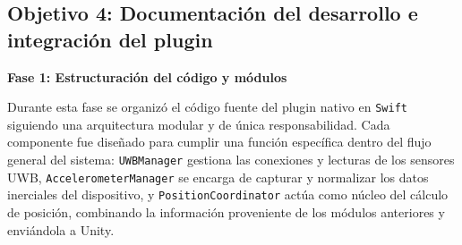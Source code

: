 




    \subsection{Objetivo 4: Documentación del desarrollo e integración del plugin}

\textbf{Fase 1: Estructuración del código y módulos}

Durante esta fase se organizó el código fuente del plugin nativo en \texttt{Swift} siguiendo una arquitectura modular y de única responsabilidad. Cada componente fue diseñado para cumplir una función específica dentro del flujo general del sistema: \texttt{UWBManager} gestiona las conexiones y lecturas de los sensores UWB, \texttt{AccelerometerManager} se encarga de capturar y normalizar los datos inerciales del dispositivo, y \texttt{PositionCoordinator} actúa como núcleo del cálculo de posición, combinando la información proveniente de los módulos anteriores y enviándola a Unity. %

